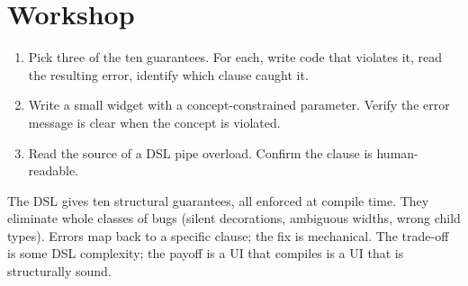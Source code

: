 \section*{Workshop}

\begin{enumerate}[leftmargin=*]
  \item Pick three of the ten guarantees. For each, write code
    that violates it, read the resulting error, identify which
     clause caught it.
  \item Write a small widget with a concept-constrained
    parameter. Verify the error message is clear when the
    concept is violated.
  \item Read the source of a DSL pipe overload. Confirm the
     clause is human-readable.
\end{enumerate}

\begin{recap}
The DSL gives ten structural guarantees, all enforced at compile
time. They eliminate whole classes of bugs (silent decorations,
ambiguous widths, wrong child types). Errors map back to a
specific  clause; the fix is mechanical. The
trade-off is some DSL complexity; the payoff is a UI that
compiles is a UI that is structurally sound.
\end{recap}
